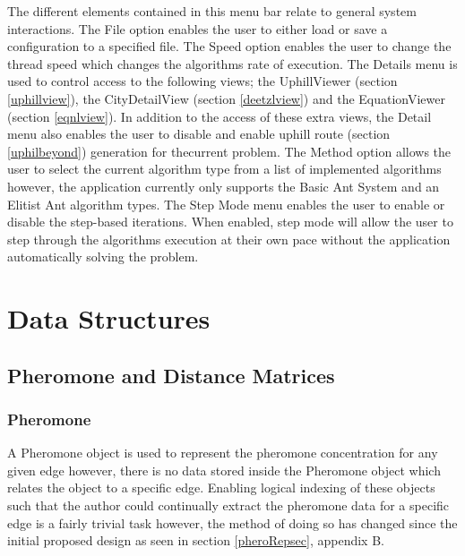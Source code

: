 The different elements contained in this menu bar relate to general system interactions. The File option enables the user to either load or save a configuration to a specified file. The Speed option enables the user to change the thread speed which changes the algorithms rate of execution. The Details menu is used to control access to the following views; the UphillViewer (section \ref{uphillview}), the CityDetailView (section \ref{deetzlview}) and the EquationViewer (section \ref{eqnlview}). In addition to the access of these extra views, the Detail menu also enables the user to disable and enable uphill route (section \ref{uphilbeyond}) generation for thecurrent problem. The Method option allows the user to select the current algorithm type from a list of implemented algorithms however, the application currently only supports the Basic Ant System and an Elitist Ant algorithm types. The Step Mode menu enables the user to enable or disable the step-based iterations. When enabled, step mode will allow the user to step through the algorithms execution at their own pace without the application automatically solving the problem.

\section{Data Structures}

\subsection{Pheromone and Distance Matrices}

\subsubsection{Pheromone}
\label{phero:struct}
A Pheromone object is used to represent the pheromone concentration for any given edge however, there is no data stored inside the Pheromone object which relates the object to a specific edge. Enabling logical indexing of these objects such that the author could continually extract the pheromone data for a specific edge is a fairly trivial task however, the method of doing so has changed since the initial proposed design as seen in section \ref{pheroRepsec}, appendix B.

